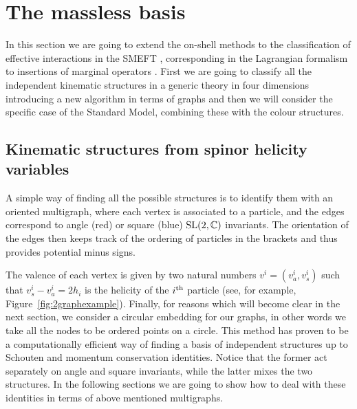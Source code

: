\documentclass[aps,prd,nofootinbib,twocolumn,10pt]{revtex4-2}
\begin{document}
\section{The massless basis}

In this section we are going to extend the on-shell methods to the classification of effective interactions \cite{Shadmi:2018xan,Falkowski:2019zdo,Durieux:2020gip} in the SMEFT \cite{Ma:2019gtx,Aoude:2019tzn,Durieux:2019eor,Durieux:2019siw}, corresponding in the Lagrangian formalism to insertions of marginal operators \cite{Grzadkowski:2010es,Lehman:2014jma,Murphy:2020rsh,Liao:2020jmn}. First we are going to classify all the independent kinematic structures in a generic theory in four dimensions introducing a new algorithm in terms of graphs and then we will consider the specific case of the Standard Model, combining these with the colour structures.

\subsection{Kinematic structures from spinor helicity variables}\label{sec:kinematics}
%
A simple way of finding all the possible structures is to identify them with an oriented multigraph, where each vertex is associated to a particle, and the edges correspond to angle (red) or square (blue) ${\rm SL}(2,\mathbb{C})$ invariants. The orientation of the edges then keeps track of the ordering of particles in the brackets and thus provides potential minus signs.

The valence of each vertex is given by two natural numbers $v^{i}=(v^i_a,v^{i}_s)$ such that $v^i_s-v^i_a =2 h_i$ is the helicity of the $i^{\rm th}$ particle (see, for example, Figure~\ref{fig:2graphexample}). Finally, for reasons which will become clear in the next section, we consider a circular embedding for our graphs, in other words we take all the nodes to be  ordered points on a circle.
This method has proven to be a computationally efficient way of finding a basis of independent structures up to Schouten and momentum conservation identities. %
Notice that the former act separately on angle and square invariants, while the latter mixes the two structures. In the following sections we are going to show how to deal with these identities in terms of above mentioned multigraphs.
\end{document}
